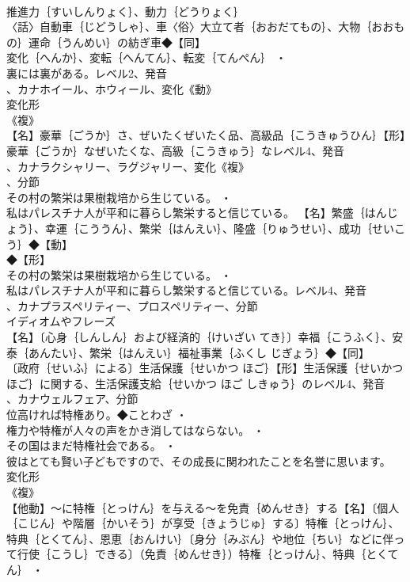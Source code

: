 \documentclass[8pt]{extreport}
\begin{document}
\begin{CJK}{UTF8}{min}
\\	推進力｛すいしんりょく｝、動力｛どうりょく｝
\\	〈話〉自動車｛じどうしゃ｝、車〈俗〉大立て者｛おおだてもの｝、大物｛おおもの｝運命｛うんめい｝の紡ぎ車◆【同】
\\	変化｛へんか｝、変転｛へんてん｝、転変｛てんぺん｝ ・
\\	裏には裏がある。レベル2、発音
\\	、カナホイール、ホウィール、変化《動》
\\	変化形 
\\	《複》
\\	【名】豪華｛ごうか｝さ、ぜいたくぜいたく品、高級品｛こうきゅうひん｝【形】豪華｛ごうか｝なぜいたくな、高級｛こうきゅう｝なレベル4、発音
\\	、カナラクシャリー、ラグジャリー、変化《複》
\\	、分節
\\	その村の繁栄は果樹栽培から生じている。 ・
\\	私はパレスチナ人が平和に暮らし繁栄すると信じている。		【名】繁盛｛はんじょう｝、幸運｛こううん｝、繁栄｛はんえい｝、隆盛｛りゅうせい｝、成功｛せいこう｝◆【動】
\\	◆【形】
\\	その村の繁栄は果樹栽培から生じている。 ・
\\	私はパレスチナ人が平和に暮らし繁栄すると信じている。レベル4、発音
\\	、カナプラスペリティー、プロスペリティー、分節
\\	イディオムやフレーズ 
\\	【名】〔心身｛しんしん｝および経済的｛けいざい てき｝〕幸福｛こうふく｝、安泰｛あんたい｝、繁栄｛はんえい｝福祉事業｛ふくし じぎょう｝◆【同】
\\	〔政府｛せいふ｝による〕生活保護｛せいかつ ほご｝【形】生活保護｛せいかつ ほご｝に関する、生活保護支給｛せいかつ ほご しきゅう｝のレベル4、発音
\\	、カナウェルフェア、分節
\\	位高ければ特権あり。◆ことわざ ・
\\	権力や特権が人々の声をかき消してはならない。 ・
\\	その国はまだ特権社会である。 ・
\\	彼はとても賢い子どもですので、その成長に関われたことを名誉に思います。	変化形 
\\	《複》
\\	【他動】～に特権｛とっけん｝を与える～を免責｛めんせき｝する【名】〔個人｛こじん｝や階層｛かいそう｝が享受｛きょうじゅ｝する〕特権｛とっけん｝、特典｛とくてん｝、恩恵｛おんけい｝〔身分｛みぶん｝や地位｛ちい｝などに伴って行使｛こうし｝できる〕（免責｛めんせき｝）特権｛とっけん｝、特典｛とくてん｝ ・

\end{CJK}
\end{document}
